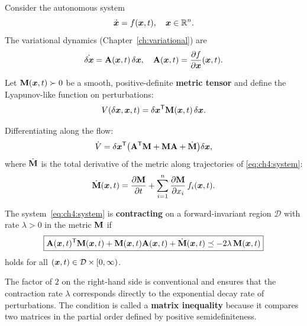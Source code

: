 Consider the autonomous system
\begin{equation}
\dot{\bm{x}} = f(\bm{x}, t), \quad \bm{x}\in\mathbb{R}^n.
\label{eq:ch4:system}
\end{equation}
The variational dynamics (Chapter~\ref{ch:variational}) are
\begin{equation}
\dot{\delta\bm{x}} = \mathbf{A}(\bm{x},t)\,\delta\bm{x},
\quad \mathbf{A}(\bm{x},t) = \frac{\partial f}{\partial\bm{x}}(\bm{x},t).
\label{eq:ch4:variational}
\end{equation}

Let $\mathbf{M}(\bm{x},t) \succ 0$ be a smooth, positive-definite \textbf{metric tensor} and
define the Lyapunov-like function on perturbations:
\begin{equation}
V(\delta\bm{x}, \bm{x}, t) = \delta\bm{x}^{\mathsf{T}} \mathbf{M}(\bm{x},t)\,\delta\bm{x}.
\label{eq:ch4:lyapunov-perturbation}
\end{equation}

Differentiating along the flow:
\begin{equation}
\dot{V} = \delta\bm{x}^{\mathsf{T}}\!\left(
\mathbf{A}^{\mathsf{T}}\mathbf{M} + \mathbf{M}\mathbf{A} + \dot{\mathbf{M}}
\right)\!\delta\bm{x},
\label{eq:ch4:Vdot}
\end{equation}
where $\dot{\mathbf{M}}$ is the total derivative of the metric along trajectories of
\eqref{eq:ch4:system}:
\begin{equation}
\dot{\mathbf{M}}(\bm{x},t) = \frac{\partial\mathbf{M}}{\partial t}
+ \sum_{i=1}^{n} \frac{\partial\mathbf{M}}{\partial x_i}\,f_i(\bm{x},t).
\label{eq:ch4:Mdot}
\end{equation}

\begin{definition}
\label{def:ch4:contraction}
The system~\eqref{eq:ch4:system} is \textbf{contracting} on a forward-invariant region
$\mathcal{D}$ with rate $\lambda>0$ in the metric $\mathbf{M}$ if
\begin{equation}
\boxed{
\mathbf{A}(\bm{x},t)^{\mathsf{T}}\mathbf{M}(\bm{x},t) + \mathbf{M}(\bm{x},t)\mathbf{A}(\bm{x},t) + \dot{\mathbf{M}}(\bm{x},t)
\preceq -2\lambda\,\mathbf{M}(\bm{x},t)
}
\label{eq:ch4:contraction-LMI}
\end{equation}
holds for all $(\bm{x},t)\in\mathcal{D}\times[0,\infty)$.
\end{definition}

\begin{remark}
The factor of $2$ on the right-hand side is conventional and ensures that the contraction
rate $\lambda$ corresponds directly to the exponential decay rate of perturbations. The
condition is called a \textbf{matrix inequality} because it compares two matrices in the
partial order defined by positive semidefiniteness.
\end{remark}


